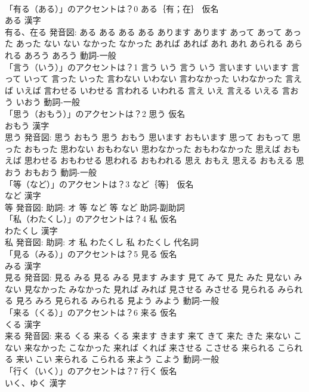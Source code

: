 \documentclass[8pt]{extreport}
\begin{document}
\begin{CJK}{UTF8}{min}
\\	「有る（ある）」のアクセントは？0	ある｛有；在｝ 仮名　
\\	ある 漢字　
\\	有る、在る 発音図:	ある ある		ある ある あります あります あって あって あった あった ない ない なかった なかった あれば あれば あれ あれ あられる あられる あろう あろう				動詞-一般 
\\	「言う（いう）」のアクセントは？1		言う いう		言う いう 言います いいます 言って いって 言った いった 言わない いわない 言わなかった いわなかった 言えば いえば 言わせる いわせる 言われる いわれる 言え いえ 言える いえる 言おう いおう				動詞-一般 
\\	「思う（おもう）」のアクセントは？2	思う 仮名　
\\	おもう 漢字　
\\	思う 発音図:	思う おもう		思う おもう 思います おもいます 思って おもって 思った おもった 思わない おもわない 思わなかった おもわなかった 思えば おもえば 思わせる おもわせる 思われる おもわれる 思え おもえ 思える おもえる 思おう おもおう				動詞-一般 
\\	「等（など）」のアクセントは？3	など｛等｝ 仮名　
\\	など 漢字　
\\	等 発音図: 助詞: オ	等 など		等 など				助詞-副助詞 
\\	「私（わたくし）」のアクセントは？4	私 仮名　
\\	わたくし 漢字　
\\	私 発音図: 助詞: オ	私 わたくし		私 わたくし				代名詞 
\\	「見る（みる）」のアクセントは？5	見る 仮名　
\\	みる 漢字　
\\	見る 発音図:	見る みる		見る みる 見ます みます 見て みて 見た みた 見ない みない 見なかった みなかった 見れば みれば 見させる みさせる 見られる みられる 見ろ みろ 見られる みられる 見よう みよう				動詞-一般 
\\	「来る（くる）」のアクセントは？6	来る 仮名　
\\	くる 漢字　
\\	来る 発音図:	来る くる		来る くる 来ます きます 来て きて 来た きた 来ない こない 来なかった こなかった 来れば くれば 来させる こさせる 来られる こられる 来い こい 来られる こられる 来よう こよう				動詞-一般 
\\	「行く（いく）」のアクセントは？7	行く 仮名　
\\	いく、ゆく 漢字　

\end{CJK}
\end{document}
